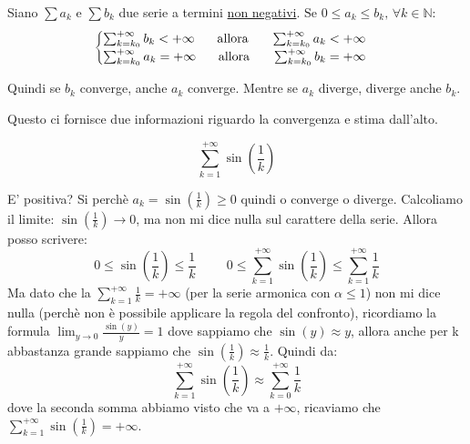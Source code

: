 \begin{thm}[Confronto]
    Siano $\sum a_k$ e $\sum b_k$ due serie a termini \underline{non negativi}. $\text{Se } 0\leq a_k\leq b_k\text{, }\forall k\in\mathbb{N}$:
    $$\begin{cases}
        \sum^{+\infty}_{k=k_0}b_k<+\infty\hspace{0.5cm}\text{ allora }\hspace{0.5cm}\sum^{+\infty}_{k=k_0}a_k<+\infty\\
        \sum^{+\infty}_{k=k_0}a_k=+\infty\hspace{0.5cm}\text{ allora }\hspace{0.5cm}\sum^{+\infty}_{k=k_0}b_k=+\infty
    \end{cases}$$
\end{thm}
Quindi se $b_k$ converge, anche $a_k$ converge. Mentre se $a_k$ diverge, diverge anche $b_k$.

Questo ci fornisce due informazioni riguardo la convergenza e stima dall'alto.

\begin{example}
    \begin{equation*}\sum^{+\infty}_{k=1}\sin(\frac{1}{k})\end{equation*}
    
    E' positiva? Si perchè $a_k=\sin(\frac{1}{k})\geq0$ quindi o converge o diverge.
    Calcoliamo il limite: $\sin(\frac{1}{k})\to0$, ma non mi dice nulla sul carattere della serie. Allora posso scrivere:
    \begin{equation*}
        0\leq\sin(\frac{1}{k})\leq \frac{1}{k}\hspace{1cm}0\leq\sum^{+\infty}_{k=1}\sin(\frac{1}{k})\leq\sum^{+\infty}_{k=1}\frac{1}{k}
    \end{equation*}
    Ma dato che la $\sum^{+\infty}_{k=1}\frac{1}{k}=+\infty$ (per la serie armonica con $\alpha\leq1$) non mi dice nulla (perchè non è possibile applicare la regola del confronto), ricordiamo la formula $\lim_{y\to0}\frac{\sin(y)}{y}=1$ dove sappiamo che $\sin(y)\approx y$, allora anche per k abbastanza grande sappiamo che $\sin(\frac{1}{k})\approx\frac{1}{k}$. Quindi da:
    \begin{equation*}
        \sum^{+\infty}_{k=1}\sin(\frac{1}{k})\approx\sum^{+\infty}_{k=0}\frac{1}{k}
    \end{equation*}
    dove la seconda somma abbiamo visto che va a $+\infty$, ricaviamo che $ \sum^{+\infty}_{k=1}\sin(\frac{1}{k})=+\infty$.
\end{example}

